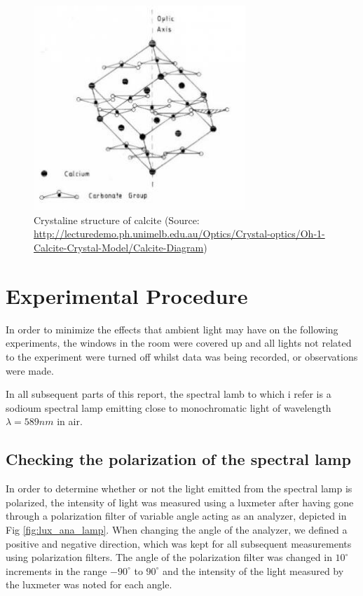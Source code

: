 \documentclass[11pt,a4paper,twocolumn]{article}
\begin{document}
    \begin{figure}[H]
      \center
      \includegraphics[width=8cm]{scripts/figs/calcite.jpg}
      \caption{Crystaline structure of calcite (Source: \url{http://lecturedemo.ph.unimelb.edu.au/Optics/Crystal-optics/Oh-1-Calcite-Crystal-Model/Calcite-Diagram})}
      \label{fig:calcite}
    \end{figure}

\section{\label{section:experimental}Experimental Procedure} 
  
  In order to minimize the effects that ambient light may have on the following experiments, the windows in the room were covered up and all lights not related to the experiment were turned off whilst data was being recorded, or observations were made.

  In all subsequent parts of this report, the spectral lamb to which i refer is a sodioum spectral lamp emitting close to monochromatic light of wavelength $\lambda=589nm$ in air.

  \subsection{\label{subsect:polar_lamp}Checking the polarization of the spectral lamp}
    In order to determine whether or not the light emitted from the spectral lamp is polarized, the intensity of light was measured using a luxmeter\cite{data:luxmeter} after having gone through a polarization filter of variable angle acting as an analyzer, depicted in Fig \ref{fig:lux_ana_lamp}. When changing the angle of the analyzer, we defined a positive and negative direction, which was kept for all subsequent measurements using polarization filters. The angle of the polarization filter was changed in $10^\circ$ increments in the range $-90^\circ$ to $90^\circ$ and the intensity of the light measured by the luxmeter was noted for each angle. 
\end{document}
